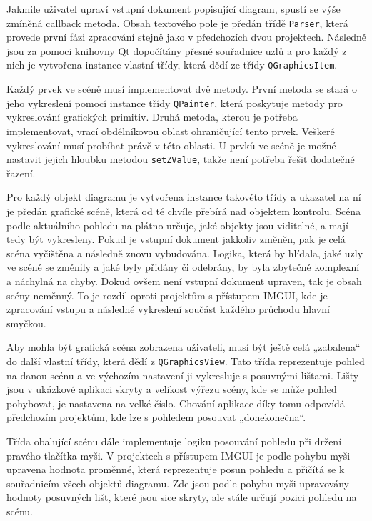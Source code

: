 \documentclass[FM,DP]{tulthesis}
\begin{document}
	Jakmile uživatel upraví vstupní dokument popisující diagram, spustí se výše zmíněná callback metoda. Obsah textového pole je předán třídě \texttt{Parser}, která provede první fázi zpracování stejně jako v předchozích dvou projektech. Následně jsou za pomoci knihovny Qt dopočítány přesné souřadnice uzlů a pro každý z nich je vytvořena instance vlastní třídy, která dědí ze třídy \texttt{QGraphicsItem}.
	
	Každý prvek ve scéně musí implementovat dvě metody. První metoda se stará o jeho vykreslení pomocí instance třídy \texttt{QPainter}, která poskytuje metody pro vykreslování grafických primitiv. Druhá metoda, kterou je potřeba implementovat, vrací obdélníkovou oblast ohraničující tento prvek. Veškeré vykreslování musí probíhat právě v této oblasti. U prvků ve scéně je možné nastavit jejich hloubku metodou \texttt{setZValue}, takže není potřeba řešit dodatečné řazení.
	
	Pro každý objekt diagramu je vytvořena instance takovéto třídy a ukazatel na ní je předán grafické scéně, která od té chvíle přebírá nad objektem kontrolu. Scéna podle aktuálního pohledu na plátno určuje, jaké objekty jsou viditelné, a mají tedy být vykresleny. Pokud je vstupní dokument jakkoliv změněn, pak je celá scéna vyčištěna a následně znovu vybudována. Logika, která by hlídala, jaké uzly ve scéně se změnily a jaké byly přidány či odebrány, by byla zbytečně komplexní a náchylná na chyby. Dokud ovšem není vstupní dokument upraven, tak je obsah scény neměnný. To je rozdíl oproti projektům s přístupem IMGUI, kde je zpracování vstupu a následné vykreslení součást každého průchodu hlavní smyčkou.
	
	Aby mohla být grafická scéna zobrazena uživateli, musí být ještě celá „zabalena“ do další vlastní třídy, která dědí z \texttt{QGraphicsView}. Tato třída reprezentuje pohled na danou scénu a ve výchozím nastavení ji vykresluje s posuvnými lištami. Lišty jsou v ukázkové aplikaci skryty a velikost výřezu scény, kde se může pohled pohybovat, je nastavena na velké číslo. Chování aplikace díky tomu odpovídá předchozím projektům, kde lze s pohledem posouvat „donekonečna“.
	
	Třída obalující scénu dále implementuje logiku posouvání pohledu při držení pravého tlačítka myši. V projektech s přístupem IMGUI je podle pohybu myši upravena hodnota proměnné, která reprezentuje posun pohledu a přičítá se k souřadnicím všech objektů diagramu. Zde jsou podle pohybu myši upravovány hodnoty posuvných lišt, které jsou sice skryty, ale stále určují pozici pohledu na scénu.
	
\end{document}
